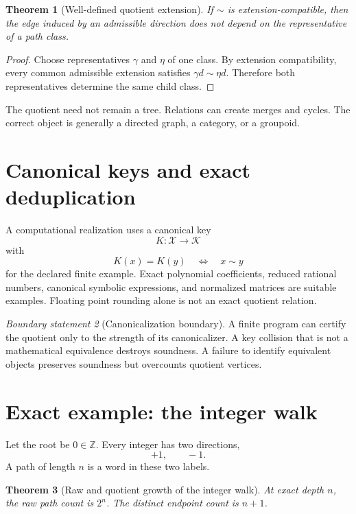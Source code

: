 \documentclass[11pt,openany]{report}
\newtheorem{theorem}{Theorem}[chapter]
\theoremstyle{definition}
\theoremstyle{remark}
\newtheorem{boundary}[theorem]{Boundary statement}
\newcommand{\Z}{\mathbb Z}
\newcommand{\Xcal}{\mathcal X}
\begin{document}
\begin{theorem}[Well-defined quotient extension]
If $\sim$ is extension-compatible, then the edge induced by an admissible direction does not depend on the representative of a path class.
\end{theorem}

\begin{proof}
Choose representatives $\gamma$ and $\eta$ of one class. By extension compatibility, every common admissible extension satisfies $\gamma d\sim\eta d$. Therefore both representatives determine the same child class.
\end{proof}

The quotient need not remain a tree. Relations can create merges and cycles. The correct object is generally a directed graph, a category, or a groupoid.

\section{Canonical keys and exact deduplication}

A computational realization uses a canonical key
\[
K:\Xcal\longrightarrow\mathcal K
\]
with
\[
K(x)=K(y)
\quad\Longleftrightarrow\quad
x\sim y
\]
for the declared finite example. Exact polynomial coefficients, reduced rational numbers, canonical symbolic expressions, and normalized matrices are suitable examples. Floating point rounding alone is not an exact quotient relation.

\begin{boundary}[Canonicalization boundary]
A finite program can certify the quotient only to the strength of its canonicalizer. A key collision that is not a mathematical equivalence destroys soundness. A failure to identify equivalent objects preserves soundness but overcounts quotient vertices.
\end{boundary}

\section{Exact example: the integer walk}

Let the root be $0\in\Z$. Every integer has two directions,
\[
+1,
\qquad
-1.
\]
A path of length $n$ is a word in these two labels.

\begin{theorem}[Raw and quotient growth of the integer walk]
At exact depth $n$, the raw path count is $2^n$. The distinct endpoint count is $n+1$.
\end{theorem}
\end{document}
